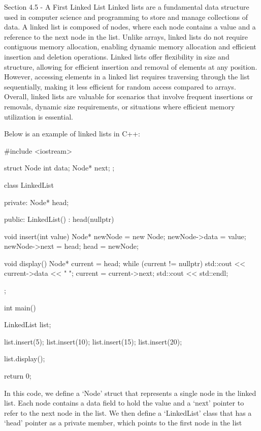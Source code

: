 \begin{notes}{Section 4.5 - A First Linked List}
    Linked lists are a fundamental data structure used in computer science and programming to store and manage collections of data. A linked list is composed of nodes, where each node contains a value and a reference to the next node in the list. Unlike 
    arrays, linked lists do not require contiguous memory allocation, enabling dynamic memory allocation and efficient insertion and deletion operations. Linked lists offer flexibility in size and structure, allowing for efficient insertion and removal of 
    elements at any position. However, accessing elements in a linked list requires traversing through the list sequentially, making it less efficient for random access compared to arrays. Overall, linked lists are valuable for scenarios that involve frequent 
    insertions or removals, dynamic size requirements, or situations where efficient memory utilization is essential.
    
    \begin{highlight}
        Below is an example of linked lists in C++:
        
    \begin{code}[C++]   
    #include <iostream>
    
    struct Node {
        int data;
        Node* next;
    };
    
    class LinkedList {
    private:
        Node* head;
    
    public:
        LinkedList() : head(nullptr) {}
    
        void insert(int value) {
            Node* newNode = new Node;
            newNode->data = value;
            newNode->next = head;
            head = newNode;
        }
    
        void display() {
            Node* current = head;
            while (current != nullptr) {
                std::cout << current->data << " ";
                current = current->next;
            }
            std::cout << std::endl;
        }
    };
    
    int main() {
        LinkedList list;
    
        list.insert(5);
        list.insert(10);
        list.insert(15);
        list.insert(20);
    
        list.display();
    
        return 0;
    }
    \end{code}
        In this code, we define a `Node' struct that represents a single node in the linked list. Each node contains a data field to hold the value and a `next' pointer to refer to the next node in the list. We then define a `LinkedList' class that has a `head' 
        pointer as a private member, which points to the first node in the list
        

\end{highlight}
\end{notes}
